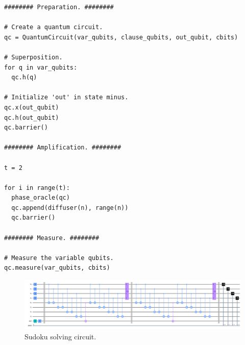 \documentclass{article}
\begin{document}
\begin{verbatim}
######## Preparation. ########

# Create a quantum circuit.
qc = QuantumCircuit(var_qubits, clause_qubits, out_qubit, cbits)

# Superposition.
for q in var_qubits:
  qc.h(q)

# Initialize 'out' in state minus.
qc.x(out_qubit)
qc.h(out_qubit)
qc.barrier()

######## Amplification. ########

t = 2

for i in range(t):
  phase_oracle(qc)
  qc.append(diffuser(n), range(n))
  qc.barrier()

######## Measure. ########

# Measure the variable qubits.
qc.measure(var_qubits, cbits)

\end{verbatim}
\begin{figure}[H]
  \centering
  \includegraphics[width=345pt]{Img/circuit.png}
  \caption{Sudoku solving circuit.}
\end{figure}
\end{document}

